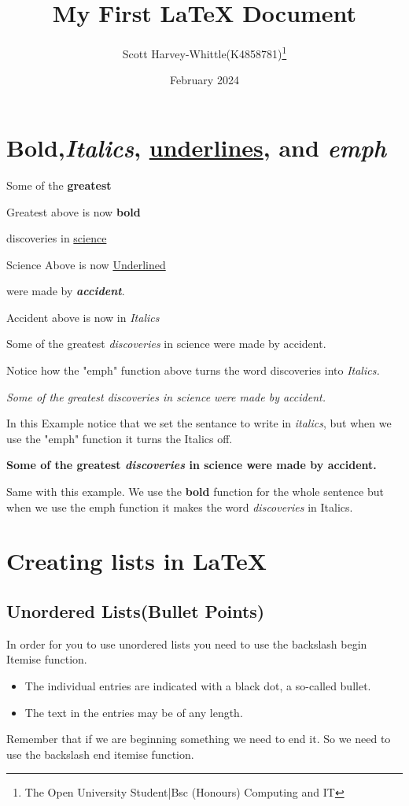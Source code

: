 \documentclass[12pt,a4paper,landscape]{article}
\title{My First \LaTeX{} Document}
\author{Scott Harvey-Whittle(K4858781)\thanks {The Open University Student|Bsc (Honours) Computing and IT}}
\date{February 2024}
\begin{document}
\maketitle
\begin{flushleft}
    

\section{\textbf{Bold},\textit{Italics}, \underline{underlines}, and \emph{emph}}
Some of the \textbf{greatest}

Greatest above is now \textbf{bold} 

discoveries in \underline{science} 

Science Above is now \underline{Underlined}

were made by \textbf{\textit{accident}}.

Accident above is now in \textit{Italics}


Some of the greatest \emph{discoveries} in science 
were made by accident.

Notice how the "emph" function above turns the word discoveries into  \emph{Italics.}

\textit{Some of the greatest \emph{discoveries} 
in science were made by accident.}

In this Example notice that we set the sentance to write in \textit{italics}, but when we use the "emph" function it turns the Italics off. 

\textbf{Some of the greatest \emph{discoveries} 
in science were made by accident.}

Same with this example. We use the \textbf{bold} function for the whole sentence but when we use the emph function it makes the word \textit{discoveries} in Italics.

\section{Creating lists in \LaTeX{}}

\subsection{Unordered Lists(Bullet Points)}

In order for you to use unordered lists you need to use the backslash begin Itemise function.

\begin{itemize}
  \item The individual entries are indicated with a black dot, a so-called bullet.
  \item The text in the entries may be of any length.
\end{itemize}
Remember that if we are beginning something we need to end it. So we need to use the backslash end itemise function. 


\end{flushleft}
\end{document}
